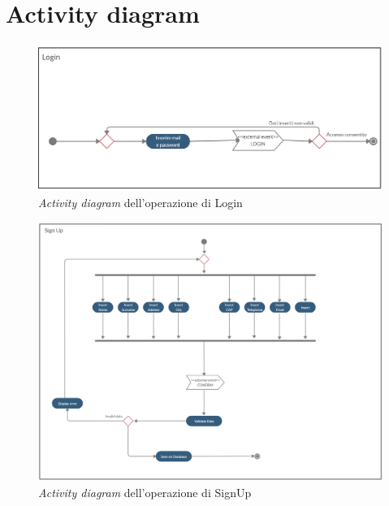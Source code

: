 \documentclass[a4paper,12pt,titlepage]{article}
\begin{document}
{{{\section{Activity diagram}\label{sec:activitydiagram}
\begin{figure}[H]
		\centering
		\includegraphics[scale=0.35, angle=90]{activityDiagramLogin}
		\caption{\textit{Activity diagram} dell'operazione di Login}
\end{figure}
\begin{figure}[H]
		\centering
		\includegraphics[scale=0.34, angle=90]{activityDiagramSignUp}
		\caption{\textit{Activity diagram} dell'operazione di SignUp}
\end{figure}
\begin{figure}[H]
		\centering

\end{figure}}}}
\end{document}
